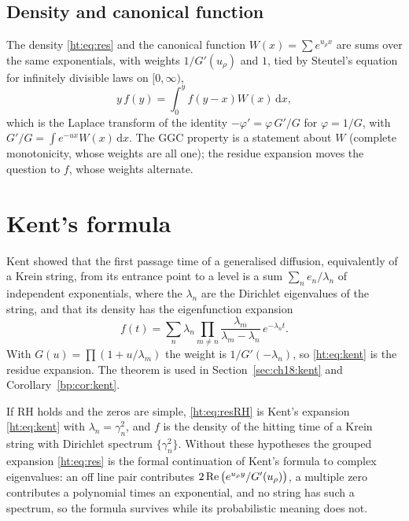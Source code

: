 \subsection{Density and canonical function}

The density \eqref{ht:eq:res} and the canonical function $W(x)=\sum e^{u_\rho x}$ are sums over the same exponentials, with weights $1/G'(u_\rho)$ and $1$, tied by Steutel's equation for infinitely divisible laws on $[0,\infty)$,
\begin{equation}\label{ht:eq:steutel}
y\,f(y)=\int_0^yf(y-x)W(x)\,\mathrm{d}x,
\end{equation}
which is the Laplace transform of the identity $-\varphi'=\varphi\,G'/G$ for $\varphi=1/G$, with $G'/G=\int e^{-ux}W(x)\,\mathrm{d}x$. The GGC property is a statement about $W$ (complete monotonicity, whose weights are all one); the residue expansion moves the question to $f$, whose weights alternate.

\section{Kent's formula}\label{ht:sec:kent}

Kent \cite{Kent80} showed that the first passage time of a generalised diffusion, equivalently of a Krein string, from its entrance point to a level is a sum $\sum_ne_n/\lambda_n$ of independent exponentials, where the $\lambda_n$ are the Dirichlet eigenvalues of the string, and that its density has the eigenfunction expansion
\begin{equation}\label{ht:eq:kent}
f(t)=\sum_n\lambda_n\prod_{m\ne n}\frac{\lambda_m}{\lambda_m-\lambda_n}\,e^{-\lambda_nt}.
\end{equation}
With $G(u)=\prod(1+u/\lambda_m)$ the weight is $1/G'(-\lambda_n)$, so \eqref{ht:eq:kent} is the residue expansion. The theorem is used in Section~\ref{sec:ch18:kent} and Corollary~\ref{bp:cor:kent}.

\begin{proposition}\label{ht:prop:kent}
If RH holds and the zeros are simple, \eqref{ht:eq:resRH} is Kent's expansion \eqref{ht:eq:kent} with $\lambda_n=\gamma_n^2$, and $f$ is the density of the hitting time of a Krein string with Dirichlet spectrum $\{\gamma_n^2\}$. Without these hypotheses the grouped expansion \eqref{ht:eq:res} is the formal continuation of Kent's formula to complex eigenvalues: an off line pair contributes $2\operatorname{Re}\big(e^{u_\rho y}/G'(u_\rho)\big)$, a multiple zero contributes a polynomial times an exponential, and no string has such a spectrum, so the formula survives while its probabilistic meaning does not.
\end{proposition}


